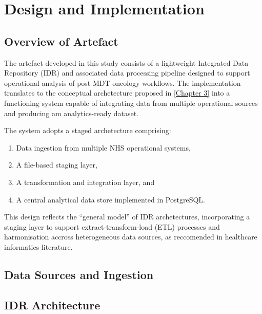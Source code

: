 \chapter{Design and Implementation}

\section{Overview of Artefact}

The artefact developed in this study consists of a lightweight Integrated Data Repository (IDR) and associated data processing pipeline designed to support operational analysis of post-MDT oncology workflows. The implementation translates to the conceptual archetecture proposed in \ref{Chapter 3} into a functioning system capable of integrating data from multiple operational sources and producing am analytics-ready dataset. 

The system adopts a staged archetecture comprising: 
\begin{enumerate}
    \item Data ingestion from multiple NHS operational systems,
    \item A file-based staging layer,
    \item A transformation and integration layer, and
    \item A central analytical data store implemented in PostgreSQL. 
\end{enumerate}

This design reflects the ``general model'' of IDR archetectures, incorporating a staging layer to support extract-transform-load (ETL) processes and harmonisation accross heterogeneous data sources, as reccomended in healthcare informatics literature. 

\section{Data Sources and Ingestion}


\section{IDR Architecture}




